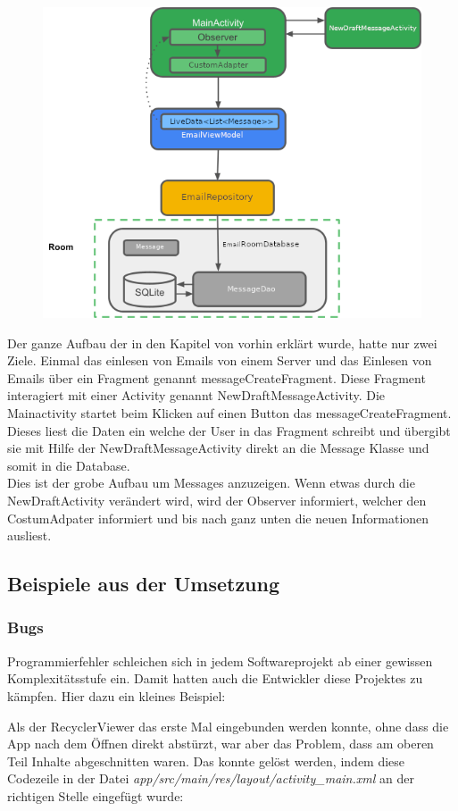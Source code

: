 \documentclass[a4paper,11pt]{article}
\begin{document}
\begin{figure}
    \includegraphics[width=.4\textwidth]{media/AppStructure.png}
\end{figure}

Der ganze Aufbau der in den Kapitel von vorhin erklärt wurde, hatte nur zwei Ziele. Einmal das einlesen von Emails von einem Server und das Einlesen von Emails
über ein Fragment genannt messageCreateFragment. Diese Fragment interagiert mit einer Activity genannt NewDraftMessageActivity. Die Mainactivity startet beim Klicken auf einen Button 
das messageCreateFragment. Dieses liest die Daten ein welche der User in das Fragment schreibt und übergibt sie mit Hilfe der NewDraftMessageActivity direkt an die Message Klasse und somit in die 
Database.  \\

Dies ist der grobe Aufbau um Messages anzuzeigen. Wenn etwas durch die NewDraftActivity verändert wird, wird der Observer informiert, welcher den CostumAdpater informiert und bis nach 
ganz unten die neuen Informationen ausliest.

\subsection{Beispiele aus der Umsetzung}
\subsubsection{Bugs}
Programmierfehler schleichen sich in jedem Softwareprojekt ab einer gewissen Komplexitätsstufe ein. Damit hatten auch die Entwickler diese Projektes zu kämpfen. Hier dazu ein kleines Beispiel:

Als der RecyclerViewer das erste Mal eingebunden werden konnte, ohne dass die App nach dem Öffnen direkt abstürzt, war aber das Problem, dass am oberen Teil Inhalte abgeschnitten waren. Das konnte gelöst werden, indem diese Codezeile in der Datei \textit{app/src/main/res/layout/activity\_main.xml} an der richtigen Stelle eingefügt wurde:
\end{document}
